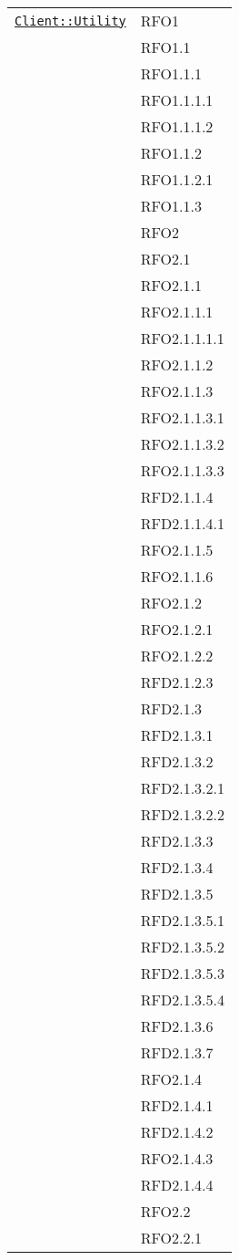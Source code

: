 \begin{longtable}{|>{\centering}m{10cm}|m{3cm}<{\centering}|}
\hyperref[Client::Utility]{\texttt{Client::Utility}} & RFO1\\
& RFO1.1\\
& RFO1.1.1\\
& RFO1.1.1.1\\
& RFO1.1.1.2\\
& RFO1.1.2\\
& RFO1.1.2.1\\
& RFO1.1.3\\
& RFO2\\
& RFO2.1\\
& RFO2.1.1\\
& RFO2.1.1.1\\
& RFO2.1.1.1.1\\
& RFO2.1.1.2\\
& RFO2.1.1.3\\
& RFO2.1.1.3.1\\
& RFO2.1.1.3.2\\
& RFO2.1.1.3.3\\
& RFD2.1.1.4\\
& RFD2.1.1.4.1\\
& RFO2.1.1.5\\
& RFO2.1.1.6\\
& RFO2.1.2\\
& RFO2.1.2.1\\
& RFO2.1.2.2\\
& RFD2.1.2.3\\
& RFD2.1.3\\
& RFD2.1.3.1\\
& RFD2.1.3.2\\
& RFD2.1.3.2.1\\
& RFD2.1.3.2.2\\
& RFD2.1.3.3\\
& RFD2.1.3.4\\
& RFD2.1.3.5\\
& RFD2.1.3.5.1\\
& RFD2.1.3.5.2\\
& RFD2.1.3.5.3\\
& RFD2.1.3.5.4\\
& RFD2.1.3.6\\
& RFD2.1.3.7\\
& RFO2.1.4\\
& RFD2.1.4.1\\
& RFD2.1.4.2\\
& RFO2.1.4.3\\
& RFD2.1.4.4\\
& RFO2.2\\
& RFO2.2.1\\

\end{longtable}
